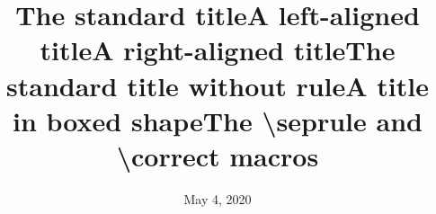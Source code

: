 \documentclass[a4paper,11pt]{article}
\renewcommand{\titlestyle}{\Huge} %
\begin{document}
\newpage
\hypertarget{schooldocs-example-center}{}

\selectfont
\pagestyle{empty}
\lfoot{}
\cfoot{}
\rfoot{}
\renewcommand{\subjectstyle}{}
\renewcommand{\authorstyle}{}
\renewcommand{\datestyle}{}
\renewcommand{\titlestyle}{\LARGE\bfseries\sffamily}
\renewcommand\subjectstyle{\large}
\setlength{\titletopskip}{-1.32cm}
\setlength\titlesep{2\medskipamount}
\schooldocstitles
\title{The standard title}
\subject[Pathography / M2A]{Pathography / Master 2A}
\date{May 4, 2020}

\maketitle
\lipsum[1]

\newpage
\hypertarget{schooldocs-example-left}{}

\renewcommand{\titleflush}{flushleft}
\title{A left-aligned title}
\maketitle
\lipsum[1]

\newpage
\hypertarget{schooldocs-example-right}{}

\renewcommand{\titleflush}{flushright}
\title{A right-aligned title}
\maketitle
\lipsum[1]

\newpage
\hypertarget{schooldocs-example-norule}{}

\renewcommand{\titleflush}{center}
\title{The standard title without rule}
\maketitle[0pt]
\lipsum[1]

\newpage
\hypertarget{schooldocs-example-boxed}{}

\renewcommand{\titlestyle}{\LARGE\sffamily\bfseries\boxedshape}
\title{A title in boxed shape}
\maketitle
\lipsum[1]

\newpage
\hypertarget{schooldocs-example-seprule}{}

\renewcommand{\titlestyle}{\LARGE\bfseries\sffamily}
\title{The \textbackslash seprule and \textbackslash correct macros}
\correct
\maketitle
\lipsum[1]\seprule\lipsum[2]\seprule\lipsum[3]
\end{document}
